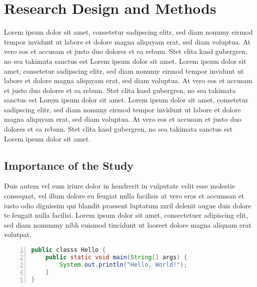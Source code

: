 \chapter{Research Design and Methods}
Lorem ipsum dolor sit amet, consetetur sadipscing elitr,  sed diam nonumy eirmod
tempor invidunt ut labore et dolore magna aliquyam erat, sed diam voluptua. At
vero eos et accusam et justo duo dolores et ea rebum. Stet clita kasd gubergren,
no sea takimata sanctus est Lorem ipsum dolor sit amet. Lorem ipsum dolor sit
amet, consetetur sadipscing elitr,  sed diam nonumy eirmod tempor invidunt ut
labore et dolore magna aliquyam erat, sed diam voluptua. At vero eos et accusam
et justo duo dolores et ea rebum. Stet clita kasd gubergren, no sea takimata
sanctus est Lorem ipsum dolor sit amet. Lorem ipsum dolor sit amet, consetetur
sadipscing elitr,  sed diam nonumy eirmod tempor invidunt ut labore et dolore
magna aliquyam erat, sed diam voluptua. At vero eos et accusam et justo duo
dolores et ea rebum. Stet clita kasd gubergren, no sea takimata sanctus est
Lorem ipsum dolor sit amet.

\section{Importance of the Study}
Duis autem vel eum iriure dolor in hendrerit in vulputate velit esse molestie
consequat, vel illum dolore eu feugiat nulla facilisis at vero eros et accumsan
et iusto odio dignissim qui blandit praesent luptatum zzril delenit augue duis
dolore te feugait nulla facilisi. Lorem ipsum dolor sit amet, consectetuer
adipiscing elit, sed diam nonummy nibh euismod tincidunt ut laoreet dolore
magna aliquam erat volutpat.

\begin{singlespace}
\begin{lstlisting}[float,
                   escapeinside='',
                   basicstyle=\ttfamily\footnotesize,
                   emphstyle=\textbf,
                   numberstyle=\tiny,
                   xleftmargin=.3cm,
                   language=java,
                   numbers=left,
                   numbersep=5pt,
                   firstnumber=auto,
                   stepnumber=1,
                   numberblanklines=true,
                   showspaces=false,
                   showstringspaces=false,
                   showtabs=false,
                   captionpos=b,
                   caption=Sample Java Source File,
                   label=Sample Java Source File]
public classs Hello {
    public static void main(String[] args) {
        System.out.println("Hello, World!");
    }
}
\end{lstlisting}
\end{singlespace}

